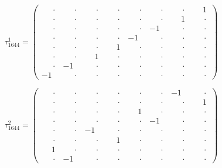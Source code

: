 \documentclass[
  10pt,
]{article}
\begin{document}
\[
\tau_{1644}^{1} = \left(\begin{array}{rrrr|rrrr}
\phantom{-}\cdot & \phantom{-}\cdot & \phantom{-}\cdot & \phantom{-}\cdot & \phantom{-}\cdot & \phantom{-}\cdot & \phantom{-}\cdot & \phantom{-}1 \\[-1.8pt]
\phantom{-}\cdot & \phantom{-}\cdot & \phantom{-}\cdot & \phantom{-}\cdot & \phantom{-}\cdot & \phantom{-}\cdot & \phantom{-}1 & \phantom{-}\cdot \\[-1.8pt]
\phantom{-}\cdot & \phantom{-}\cdot & \phantom{-}\cdot & \phantom{-}\cdot & \phantom{-}\cdot & -1 & \phantom{-}\cdot & \phantom{-}\cdot \\[-1.8pt]
\phantom{-}\cdot & \phantom{-}\cdot & \phantom{-}\cdot & \phantom{-}\cdot & -1 & \phantom{-}\cdot & \phantom{-}\cdot & \phantom{-}\cdot \\[-1.8pt]
\hline
\phantom{-}\cdot & \phantom{-}\cdot & \phantom{-}\cdot & \phantom{-}1 & \phantom{-}\cdot & \phantom{-}\cdot & \phantom{-}\cdot & \phantom{-}\cdot \\[-1.8pt]
\phantom{-}\cdot & \phantom{-}\cdot & \phantom{-}1 & \phantom{-}\cdot & \phantom{-}\cdot & \phantom{-}\cdot & \phantom{-}\cdot & \phantom{-}\cdot \\[-1.8pt]
\phantom{-}\cdot & -1 & \phantom{-}\cdot & \phantom{-}\cdot & \phantom{-}\cdot & \phantom{-}\cdot & \phantom{-}\cdot & \phantom{-}\cdot \\[-1.8pt]
-1 & \phantom{-}\cdot & \phantom{-}\cdot & \phantom{-}\cdot & \phantom{-}\cdot & \phantom{-}\cdot & \phantom{-}\cdot & \phantom{-}\cdot
\end{array}\right)
\]

\[
\tau_{1644}^{2} = \left(\begin{array}{rrrr|rrrr}
\phantom{-}\cdot & \phantom{-}\cdot & \phantom{-}\cdot & \phantom{-}\cdot & \phantom{-}\cdot & \phantom{-}\cdot & -1 & \phantom{-}\cdot \\[-1.8pt]
\phantom{-}\cdot & \phantom{-}\cdot & \phantom{-}\cdot & \phantom{-}\cdot & \phantom{-}\cdot & \phantom{-}\cdot & \phantom{-}\cdot & \phantom{-}1 \\[-1.8pt]
\phantom{-}\cdot & \phantom{-}\cdot & \phantom{-}\cdot & \phantom{-}\cdot & \phantom{-}1 & \phantom{-}\cdot & \phantom{-}\cdot & \phantom{-}\cdot \\[-1.8pt]
\phantom{-}\cdot & \phantom{-}\cdot & \phantom{-}\cdot & \phantom{-}\cdot & \phantom{-}\cdot & -1 & \phantom{-}\cdot & \phantom{-}\cdot \\[-1.8pt]
\hline
\phantom{-}\cdot & \phantom{-}\cdot & -1 & \phantom{-}\cdot & \phantom{-}\cdot & \phantom{-}\cdot & \phantom{-}\cdot & \phantom{-}\cdot \\[-1.8pt]
\phantom{-}\cdot & \phantom{-}\cdot & \phantom{-}\cdot & \phantom{-}1 & \phantom{-}\cdot & \phantom{-}\cdot & \phantom{-}\cdot & \phantom{-}\cdot \\[-1.8pt]
\phantom{-}1 & \phantom{-}\cdot & \phantom{-}\cdot & \phantom{-}\cdot & \phantom{-}\cdot & \phantom{-}\cdot & \phantom{-}\cdot & \phantom{-}\cdot \\[-1.8pt]
\phantom{-}\cdot & -1 & \phantom{-}\cdot & \phantom{-}\cdot & \phantom{-}\cdot & \phantom{-}\cdot & \phantom{-}\cdot & \phantom{-}\cdot
\end{array}\right)
\]
\end{document}

